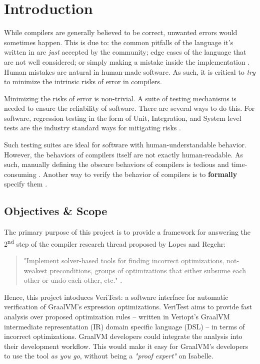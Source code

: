 \chapter{Introduction \label{sec:introduction}}

While compilers are generally believed to be correct, unwanted errors would sometimes happen. This is due to: the common pitfalls of the 
language it's written in are \emph{just} accepted by the community; edge cases of the language that are not well considered; or simply making a 
mistake inside the implementation \cite[Sec. 1.2]{CompilerOptimization}. Human mistakes are natural in human-made software. As such, it is 
critical to \emph{try} to minimize the intrinsic risks of error in compilers.

Minimizing the risks of error is non-trivial. A suite of testing mechanisms is needed to ensure the reliability of software. 
There are several ways to do this. For software, regression testing in the form of Unit, Integration, and System level tests are the 
industry standard ways for mitigating risks \cite{testing}. 

Such testing suites are ideal for software with human-understandable behavior. However, 
the behaviors of compilers itself are not exactly human-readable. As such, manually defining the obscure behaviors of compilers is tedious and 
time-consuming \cite{compcertVerification}. Another way to verify the behavior of compilers is to \textbf{formally} 
specify them \cite{compcertVerification}.

\section{Objectives \& Scope}

The primary purpose of this project is to provide a framework for answering the 2\textsuperscript{nd} step of the compiler research thread proposed by 
Lopes and Regehr:

\begin{quote}
    "Implement solver-based tools for finding incorrect optimizations, not-weakest
    preconditions, groups of optimizations that either subsume each other or
    undo each other, etc." \cite[p. 5]{CompilerOptimization}.
\end{quote}

Hence, this project intoduces VeriTest: a software interface for automatic verification of GraalVM's expression optimizations. VeriTest aims to provide 
fast analysis over proposed optimization rules -- written in Veriopt's GraalVM intermediate representation (IR) domain specific language 
(DSL) \cite[Sec. 3]{Term_Graph_Optimizations} -- in terms of incorrect optimizations. GraalVM developers could integrate the analysis into 
their development workflow. This would make it easy for GraalVM's developers to use the tool \emph{as you go}, 
without being a \emph{"proof expert"} on Isabelle.

